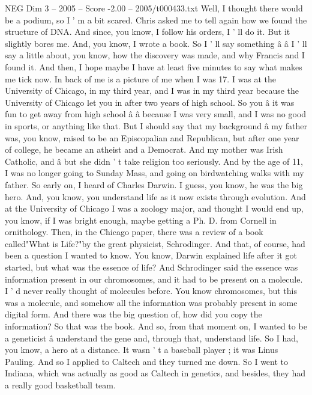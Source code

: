 \begin{textsample}{NEG Dim 3 – 2005 – Score -2.00 – 2005/t000433.txt}  \label{ex:f3_neg_035}
Well, I thought there would be a podium, so I ' m a bit scared.
Chris asked me to tell again how we found the structure of DNA.
And since, you know, I follow his orders, I ' ll do it.
But it slightly bores me.
And, you know, I wrote a book.
So I ' ll say something â â I ' ll say a little about, you know, how the discovery was made, and why Francis and I found it.
And then, I hope maybe I have at least five minutes to say what makes me tick now.
In back of me is a picture of me when I was 17.
I was at the University of Chicago, in my third year, and I was in my third year because the University of Chicago let you in after two years of high school.
So you â it was fun to get away from high school â â because I was very small, and I was no good in sports, or anything like that.
But I should say that my background â my father was, you know, raised to be an Episcopalian and Republican, but after one year of college, he became an atheist and a Democrat.
And my mother was Irish Catholic, and â but she didn ' t take religion too seriously.
And by the age of 11, I was no longer going to Sunday Mass, and going on birdwatching walks with my father.
So early on, I heard of Charles Darwin.
I guess, you know, he was the big hero.
And, you know, you understand life as it now exists through evolution.
And at the University of Chicago I was a zoology major, and thought I would end up, you know, if I was bright enough, maybe getting a Ph.
D. from Cornell in ornithology.
Then, in the Chicago paper, there was a review of a book called"What is Life?"by the great physicist, Schrodinger.
And that, of course, had been a question I wanted to know.
You know, Darwin explained life after it got started, but what was the essence of life?
And Schrodinger said the essence was information present in our chromosomes, and it had to be present on a molecule.
I ' d never really thought of molecules before.
You know chromosomes, but this was a molecule, and somehow all the information was probably present in some digital form.
And there was the big question of, how did you copy the information?
So that was the book.
And so, from that moment on, I wanted to be a geneticist â understand the gene and, through that, understand life.
So I had, you know, a hero at a distance.
It wasn ' t a baseball player ; it was Linus Pauling.
And so I applied to Caltech and they turned me down.
So I went to Indiana, which was actually as good as Caltech in genetics, and besides, they had a really good basketball team.

\end{textsample}
